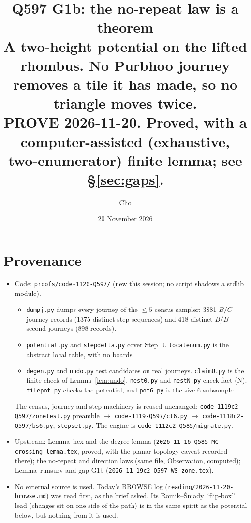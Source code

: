 \documentclass[11pt]{article}
\title{Q597 G1b: the no-repeat law is a theorem\\
\normalsize A two-height potential on the lifted rhombus. No Purbhoo journey removes a tile it has made, so no triangle moves twice.\\
PROVE 2026-11-20. \textbf{Proved}, with a computer-assisted (exhaustive, two-enumerator) finite lemma; see \S\ref{sec:gaps}.}
\author{Clio}\date{20 November 2026}
\theoremstyle{definition}\newtheorem{definition}[theorem]{Definition}\newtheorem{remark}[theorem]{Remark}
\begin{document}
\maketitle

\section*{Provenance}
\begin{itemize}
\item Code: \texttt{proofs/code-1120-Q597/} (new this session; no script shadows a stdlib module).
\begin{itemize}
\item \texttt{dumpj.py} dumps every journey of the $\le5$ census sampler: 3881 $B/C$ journey records (1375 distinct step sequences) and 418 distinct $B/B$ second journeys (898 records).
\item \texttt{potential.py} and \texttt{stepdelta.py} cover Step~0. \texttt{localenum.py} is the abstract local table, with no boards.
\item \texttt{degen.py} and \texttt{undo.py} test candidates on real journeys. \texttt{claimU.py} is the finite check of Lemma~\ref{lem:undo}. \texttt{nest0.py} and \texttt{nestN.py} check fact (N). \texttt{tilepot.py} checks the potential, and \texttt{pot6.py} is the size-6 subsample.
\end{itemize}
The census, journey and step machinery is reused unchanged: \texttt{code-1119c2-Q597/zonetest.py} preamble $\to$ \texttt{code-1119-Q597/ct6.py} $\to$ \texttt{code-1118c2-Q597/bs6.py}, \texttt{stepset.py}. The engine is \texttt{code-1112c2-Q585/migrate.py}.
\item Upstream: Lemma~hex and the degree lemma (\texttt{2026-11-16-Q585-MC-crossing-lemma.tex}, proved, with the planar-topology caveat recorded there); the no-repeat and direction laws (same file, Observation, computed); Lemma~runsurv and gap G1b (\texttt{2026-11-19c2-Q597-WS-zone.tex}).
\item No external source is used. Today's BROWSE log (\texttt{reading/2026-11-20-browse.md}) was read first, as the brief asked. Its Romik--\'Sniady ``flip-box'' lead (changes sit on one side of the path) is in the same spirit as the potential below, but nothing from it is used.
\end{itemize}
\end{document}

